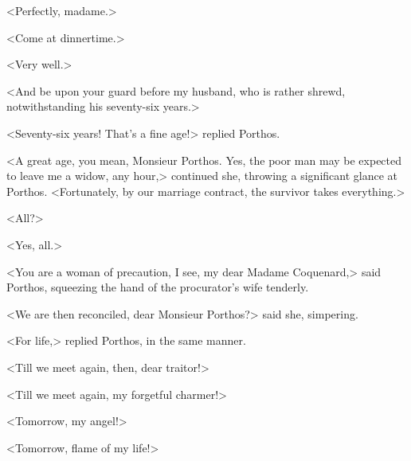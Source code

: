 <Perfectly, madame.> 

<Come at dinnertime.> 

<Very well.> 

<And be upon your guard before my husband, who is rather shrewd, notwithstanding his seventy-six years.> 

<Seventy-six years!  That's a fine age!> replied Porthos. 

<A great age, you mean, Monsieur Porthos. Yes, the poor man may be expected to leave me a widow, any hour,> continued she, throwing a significant glance at Porthos. <Fortunately, by our marriage contract, the survivor takes everything.> 

<All?> 

<Yes, all.> 

<You are a woman of precaution, I see, my dear Madame Coquenard,> said Porthos, squeezing the hand of the procurator's wife tenderly. 

<We are then reconciled, dear Monsieur Porthos?> said she, simpering. 

<For life,> replied Porthos, in the same manner. 

<Till we meet again, then, dear traitor!> 

<Till we meet again, my forgetful charmer!> 

<Tomorrow, my angel!> 

<Tomorrow, flame of my life!>
